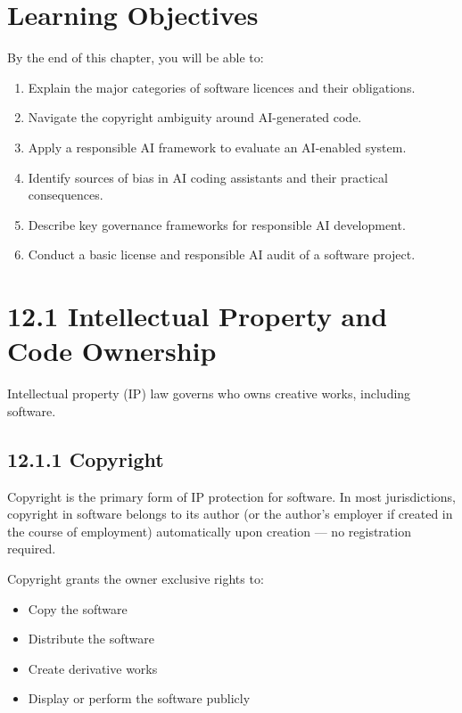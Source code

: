 \documentclass[11pt,a4paper]{book}
\begin{document}
\medskip

\section{Learning Objectives}

By the end of this chapter, you will be able to:

\begin{enumerate}
  \item Explain the major categories of software licences and their obligations.
  \item Navigate the copyright ambiguity around AI-generated code.
  \item Apply a responsible AI framework to evaluate an AI-enabled system.
  \item Identify sources of bias in AI coding assistants and their practical consequences.
  \item Describe key governance frameworks for responsible AI development.
  \item Conduct a basic license and responsible AI audit of a software project.
\end{enumerate}

\medskip

\section{12.1 Intellectual Property and Code Ownership}

Intellectual property (IP) law governs who owns creative works, including software.

\subsection{12.1.1 Copyright}

Copyright is the primary form of IP protection for software. In most jurisdictions, copyright in software belongs to its author (or the author's employer if created in the course of employment) automatically upon creation --- no registration required.

Copyright grants the owner exclusive rights to:
\begin{itemize}
  \item Copy the software
  \item Distribute the software
  \item Create derivative works
  \item Display or perform the software publicly
\end{itemize}
\end{document}
